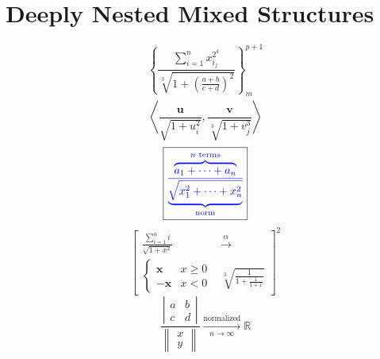 \documentclass[12pt]{article}
\begin{document}
\section{Deeply Nested Mixed Structures}

\[
\left\{\frac{\displaystyle\sum_{i=1}^{n}x_{i_j}^{2^k}}
{\sqrt[3]{1+\left(\frac{a+b}{c+d}\right)^2}}\right\}_{m}^{p+1}
\]
\[
\widehat{\left\langle\frac{\mathbf{u}}{\sqrt{1+u_i^2}},
\frac{\mathbf{v}}{\sqrt[3]{1+v_j^3}}\right\rangle}
\]
\[
\boxed{\textcolor{blue}{\frac{\overbrace{a_1+\cdots+a_n}^{n\text{ terms}}}
{\underbrace{\sqrt{x_1^2+\cdots+x_n^2}}_{\text{norm}}}}}
\]
\[
\left[\begin{array}{cc}
\frac{\sum_{i=1}^{n}i}{\sqrt{1+x^2}} & \overset{\alpha}{\longrightarrow} \\
\begin{cases}\mathbf{x}&x\geq0\\-\mathbf{x}&x<0\end{cases} &
\sqrt[3]{\frac{1}{1+\frac{1}{1+x}}}
\end{array}\right]^2
\]
\[
\frac{\left|\begin{matrix}a&b\\c&d\end{matrix}\right|}
{\left\|\begin{matrix}x\\y\end{matrix}\right\|}
\xrightarrow[n\to\infty]{\text{normalized}}\mathbb{R}
\]
\end{document}
